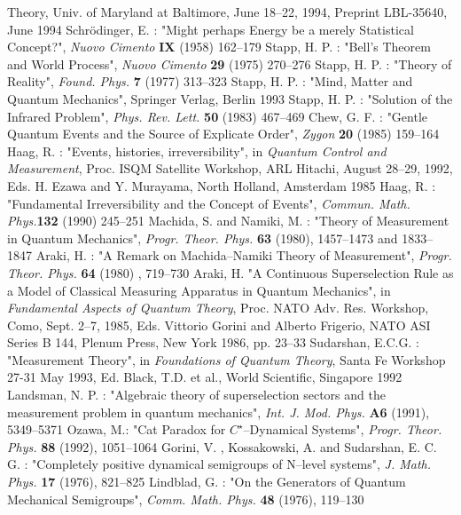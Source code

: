 \documentclass[12pt]{article}
\begin{document}
\begin{thebibliography}{99}
Theory, Univ. of Maryland at Baltimore, June 18--22, 1994,
Preprint LBL-35640, June 1994
 Schr\"odinger, E. : "Might perhaps Energy be a merely
Statistical Concept?", {\sl Nuovo Cimento} {\bf IX} (1958) 162--179
 Stapp, H. P. : "Bell's Theorem and World Process",
{\sl Nuovo Cimento} {\bf 29} (1975) 270--276
 Stapp, H. P. : "Theory of Reality", {\sl Found. Phys.}
{\bf 7} (1977) 313--323
 Stapp, H. P. : "Mind, Matter and Quantum
Mechanics", Springer Verlag, Berlin 1993
 Stapp, H. P. : "Solution of the Infrared Problem",
{\sl Phys. Rev. Lett.} {\bf 50} (1983) 467--469
 Chew, G. F. : "Gentle Quantum Events and the Source
of Explicate Order", {\sl Zygon} {\bf 20} (1985) 159--164
 Haag, R. : "Events, histories, irreversibility", in
{\sl Quantum Control and Measurement}, Proc. ISQM Satellite Workshop,
ARL Hitachi, August 28--29, 1992, Eds. H. Ezawa and Y. Murayama,
North Holland, Amsterdam 1985
 Haag, R. : "Fundamental Irreversibility and the Concept
of Events", {\sl Commun. Math. Phys.}{\bf 132} (1990) 245--251
 Machida, S. and Namiki, M. : "Theory of
Measurement in Quantum Mechanics", {\sl Progr. Theor. Phys.}
{\bf 63} (1980), 1457--1473 and 1833--1847
 Araki, H. : "A Remark on Machida--Namiki Theory
of Measurement", {\sl Progr. Theor. Phys.} {\bf 64} (1980) ,
719--730
 Araki, H. "A Continuous Superselection Rule as a Model
of Classical Measuring Apparatus in Quantum Mechanics", in {\sl Fundamental
Aspects of Quantum Theory}, Proc. NATO Adv. Res. Workshop, Como, Sept.
2--7, 1985, Eds. Vittorio Gorini and Alberto Frigerio, NATO ASI Series B
144, Plenum Press, New York 1986, pp. 23--33
 Sudarshan, E.C.G. : "Measurement Theory", in {\sl
Foundations of Quantum Theory}, Santa Fe Workshop 27-31 May 1993, Ed.
Black, T.D. et al., World Scientific, Singapore 1992
 Landsman,  N. P. : "Algebraic theory of
superselection sectors and the measurement problem in quantum
mechanics", {\sl Int. J. Mod. Phys. }{\bf A6} (1991), 5349--5371
 Ozawa, M.: "Cat Paradox for $C^{\star}$--Dynamical
Systems", {\sl Progr. Theor. Phys. }{\bf 88} (1992), 1051--1064
 Gorini,  V. ,  Kossakowski,  A.  and Sudarshan,
E. C. G. : "Completely positive dynamical semigroups of N--level
systems",  {\sl J.  Math.  Phys. }{\bf 17} (1976), 821--825
 Lindblad, G. : "On the Generators of Quantum Mechanical
Semigroups", {\sl Comm. Math. Phys. }{\bf 48} (1976), 119--130

\end{thebibliography}
\end{document}
